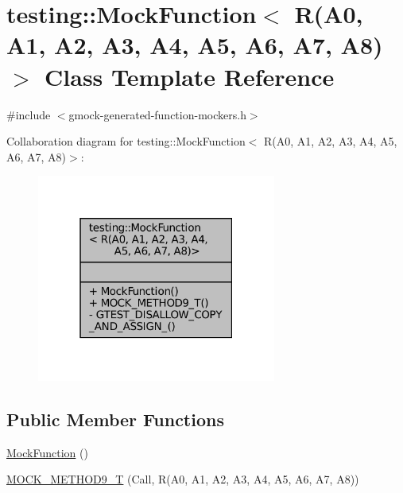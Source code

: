 \hypertarget{classtesting_1_1MockFunction_3_01R_07A0_00_01A1_00_01A2_00_01A3_00_01A4_00_01A5_00_01A6_00_01A7_00_01A8_08_4}{}\section{testing\+:\+:Mock\+Function$<$ R(A0, A1, A2, A3, A4, A5, A6, A7, A8)$>$ Class Template Reference}
\label{classtesting_1_1MockFunction_3_01R_07A0_00_01A1_00_01A2_00_01A3_00_01A4_00_01A5_00_01A6_00_01A7_00_01A8_08_4}


{\ttfamily \#include $<$gmock-\/generated-\/function-\/mockers.\+h$>$}



Collaboration diagram for testing\+:\+:Mock\+Function$<$ R(A0, A1, A2, A3, A4, A5, A6, A7, A8)$>$\+:
\nopagebreak
\begin{figure}[H]
\begin{center}
\leavevmode
\includegraphics[width=223pt]{classtesting_1_1MockFunction_3_01R_07A0_00_01A1_00_01A2_00_01A3_00_01A4_00_01A5_00_01A6_00_01A7_00_01A8_08_4__coll__graph}
\end{center}
\end{figure}
\subsection*{Public Member Functions}
\begin{DoxyCompactItemize}
\item 
\hyperlink{classtesting_1_1MockFunction_3_01R_07A0_00_01A1_00_01A2_00_01A3_00_01A4_00_01A5_00_01A6_00_01A7_00_01A8_08_4_a67f9fca4cf71a5811add15da604a6bbf}{Mock\+Function} ()
\item 
\hyperlink{classtesting_1_1MockFunction_3_01R_07A0_00_01A1_00_01A2_00_01A3_00_01A4_00_01A5_00_01A6_00_01A7_00_01A8_08_4_a0fee6ada67063cc8ec8b2181021f0195}{M\+O\+C\+K\+\_\+\+M\+E\+T\+H\+O\+D9\+\_\+T} (Call, R(A0, A1, A2, A3, A4, A5, A6, A7, A8))
\end{DoxyCompactItemize}
